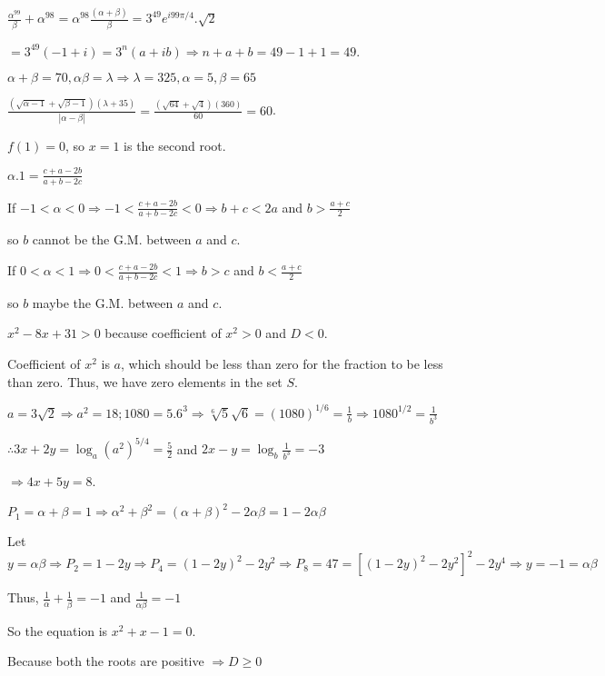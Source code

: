   $\frac{\alpha^{99}}{\beta} + \alpha^{98} = \alpha^{98}\frac{(\alpha + \beta)}{\beta} =
  3^{49}e^{i99\pi/4}.\sqrt{2}$

  $= 3^{49}(-1 + i) = 3^n(a + ib) \Rightarrow n + a + b = 49 - 1 + 1 = 49$.
\item $\alpha + \beta = 70, \alpha\beta = \lambda \Rightarrow \lambda = 325, \alpha = 5, \beta = 65$

  $\frac{\left(\sqrt{\alpha - 1} + \sqrt{\beta -1}\right)(\lambda + 35)}{|\alpha - \beta|}
  = \frac{\left(\sqrt{64} + \sqrt{4}\right)(360)}{60} = 60$.
\item $f(1) = 0$, so $x = 1$ is the second root.

  $\alpha.1 = \frac{c + a - 2b}{a + b - 2c}$

  If $-1 < \alpha < 0\Rightarrow -1 < \frac{c + a - 2b}{a + b - 2c} < 0 \Rightarrow b + c < 2a$ and $b
  > \frac{a + c}{2}$

  so $b$ cannot be the G.M. between $a$ and $c$.

  If $0 < \alpha < 1\Rightarrow 0 < \frac{c + a - 2b}{a + b - 2c} < 1\Rightarrow b > c$ and $b < \frac{a +
    c}{2}$

  so $b$ maybe the G.M. between $a$ and $c$.
\item $x^2 - 8x + 31 > 0$ because coefficient of $x^2 > 0$ and $D < 0$.

  Coefficient of $x^2$ is $a$, which should be less than zero for the fraction to be less than zero. Thus,
  we have zero elements in the set $S$.
\item $a = 3\sqrt{2}\Rightarrow a^2 = 18; 1080 = 5.6^3\Rightarrow \sqrt[6]{5}\sqrt{6} = (1080)^{1/6}
  = \frac{1}{b}\Rightarrow 1080^{1/2} = \frac{1}{b^3}$

  $\therefore 3x + 2y = \log_a\left(a^2\right)^{5/4} = \frac{5}{2}$ and $2x - y = \log_b\frac{1}{b^3} = -3$

  $\Rightarrow 4x + 5y = 8$.
\item $P_1 = \alpha + \beta = 1\Rightarrow \alpha^2 + \beta^2 = (\alpha + \beta)^2 - 2\alpha\beta = 1 -
  2\alpha\beta$

  Let $y = \alpha\beta \Rightarrow P_2 = 1 - 2y \Rightarrow P_4 = (1 - 2y)^2 - 2y^2 \Rightarrow P_8 = 47 =
  [(1 - 2y)^2 - 2y^2]^2 - 2y^4\Rightarrow y = -1 = \alpha\beta$

  Thus, $\frac{1}{\alpha} + \frac{1}{\beta} = -1$ and $\frac{1}{\alpha\beta} = -1$

  So the equation is $x^2 + x - 1 = 0$.
\item Because both the roots are positive $\Rightarrow D\geq 0$

